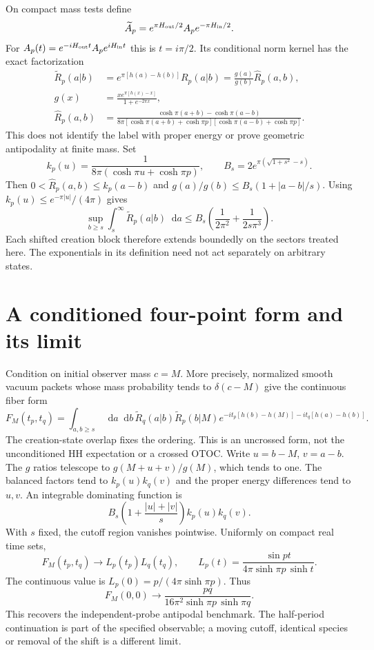 \documentclass[11pt,a4paper]{article}
\newcommand{\dd}{\mathop{}\!\mathrm d}
\begin{document}
On compact mass tests define
\[
 \widetilde A_p=e^{\pi H_{\rm out}/2}A_p e^{-\pi H_{\rm in}/2}.
\]
For $A_p(t)=e^{-iH_{\rm out}t}A_pe^{iH_{\rm in}t}$ this is $t=i\pi/2$.
Its conditional norm kernel has the exact factorization
\begin{align}
 \widetilde R_p(a|b)&=e^{\pi[h(a)-h(b)]}R_p(a|b)
                  =\frac{g(a)}{g(b)}\widehat R_p(a,b),\\
 g(x)&=\frac{x e^{\pi[h(x)-x]}}{1+e^{-2\pi x}},\\
 \widehat R_p(a,b)&=
 \frac{\cosh\pi(a+b)-\cosh\pi(a-b)}
 {8\pi[\cosh\pi(a+b)+\cosh\pi p][\cosh\pi(a-b)+\cosh\pi p]}.
\end{align}
This does not identify the label with proper energy or prove
geometric antipodality at finite mass.
Set
\[
 k_p(u)=\frac1{8\pi(\cosh\pi u+\cosh\pi p)},\qquad
 B_s=2e^{\pi(\sqrt{1+s^2}-s)}.
\]
Then $0<\widehat R_p(a,b)\le k_p(a-b)$ and
$g(a)/g(b)\le B_s(1+|a-b|/s)$. Using
$k_p(u)\le e^{-\pi|u|}/(4\pi)$ gives
\begin{equation}
 \sup_{b\ge s}\int_s^\infty\widetilde R_p(a|b)\dd a
 \le B_s\left(\frac1{2\pi^2}+\frac1{2s\pi^3}\right).
\end{equation}
Each shifted creation block therefore extends boundedly on the sectors
treated here. The exponentials in its definition need not act
separately on arbitrary states.

\newpage
\section{A conditioned four-point form and its limit}
Condition on initial observer mass $c=M$. More precisely, normalized
smooth vacuum packets whose mass probability tends to $\delta(c-M)$
give the continuous fiber form
\begin{equation}
 F_M(t_p,t_q)=\int_{a,b\ge s}\dd a\dd b\,
 \widetilde R_q(a|b)\widetilde R_p(b|M)
 e^{-it_p[h(b)-h(M)]-it_q[h(a)-h(b)]}.
\end{equation}
The creation-state overlap fixes the ordering.
This is an uncrossed form, not the unconditioned HH expectation
or a crossed OTOC. Write $u=b-M$, $v=a-b$.
The $g$ ratios telescope to $g(M+u+v)/g(M)$, which tends to one.
The balanced factors tend to $k_p(u)k_q(v)$ and the proper energy
differences tend to $u,v$. An integrable dominating function is
\[
 B_s\left(1+\frac{|u|+|v|}{s}\right)k_p(u)k_q(v).
\]
With $s$ fixed, the cutoff region vanishes pointwise. Uniformly on
compact real time sets,
\begin{equation}\boxed{
 F_M(t_p,t_q)\longrightarrow L_p(t_p)L_q(t_q),\qquad
 L_p(t)=\frac{\sin pt}{4\pi\sinh\pi p\,\sinh t}.}
\end{equation}
The continuous value is $L_p(0)=p/(4\pi\sinh\pi p)$. Thus
\[
 F_M(0,0)\longrightarrow \frac{pq}{16\pi^2\sinh\pi p\,\sinh\pi q}.
\]
This recovers the independent-probe antipodal benchmark.
The half-period continuation is part of the specified observable;
a moving cutoff, identical species or removal of the shift is a different limit.
\end{document}
